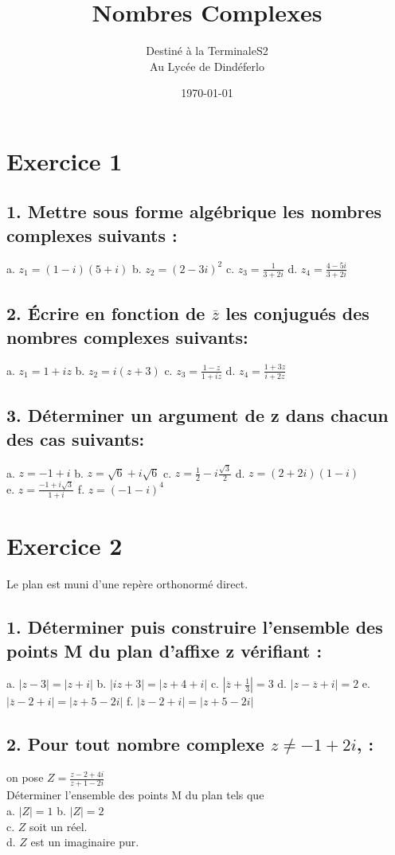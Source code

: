 \documentclass[12pt]{article}
\author{Destiné à la TerminaleS2\\Au Lycée de Dindéferlo}
\title{\textbf{Nombres Complexes}}
\date{\today}
\begin{document}
\maketitle
\newpage

\section*{Exercice 1}
\subsection*{1. Mettre sous forme algébrique les nombres complexes suivants :}
a. \(z_1 = (1 - i)(5 + i)\)\quad
b. \(z_2 = (2 - 3i)^2\)\quad
c. \(z_3 = \frac{1}{3 + 2i}\)\quad
d. \(z_4 = \frac{4 - 5i}{3 + 2i}\)

\subsection*{2. Écrire en fonction de $\overline{z}$ les conjugués des nombres complexes suivants:}
a. \(z_1 = 1 + iz\)\quad
b. \(z_2 = i(z + 3)\)\quad
c. \(z_3 =  \frac{1 - z}{1 + iz}\)\quad
d. \(z_4 =\frac{ 1 + 3z}{i + 2z}\)

\subsection*{3. Déterminer un argument de z dans chacun des cas suivants:}
a. \(z = -1 + i\)\quad
b. \(z = \sqrt{6} + i\sqrt{6}\)\quad
c. \(z = \frac{1}{2} - i\frac{\sqrt{3}}{2}\) \quad
d. \(z = (2 + 2i)(1 - i)\)\quad\\
e. \(z = \frac{-1 + i\sqrt{3}}{1 + i}\)\quad
f. \(z = (-1 - i)^4\)

\section*{Exercice 2}
Le plan est muni d’une repère orthonormé direct.
\subsection*{1. Déterminer puis construire l’ensemble des points M du plan d’affixe z vérifiant :}
a. \(|z - 3| = |z + i|\)\quad
b. \(|iz + 3| = |z + 4 + i|\)\quad
c. \(|\overline{z} + \frac{1}{3}| = 3\)\quad
d. \(|z - \overline{z} + i| = 2\)\quad
e. \(|\overline{z} - 2 + i| = |z + 5 - 2i|\)\quad
f. \(|\overline{z} - 2 + i| = |z + 5 - 2i|\)\quad

\subsection*{2. Pour tout nombre complexe $ z \neq -1 + 2i $, :}
on pose \(Z =\frac{z - 2 + 4i}{z + 1 - 2i}\)\\
Déterminer l’ensemble des points M du plan tels que\\
a. \(|Z| = 1\)\quad
b. \(|Z| = 2\)\quad \\
c. \(Z\) soit un réel.\\
d. \(Z\) est un imaginaire pur.\\
\end{document}
